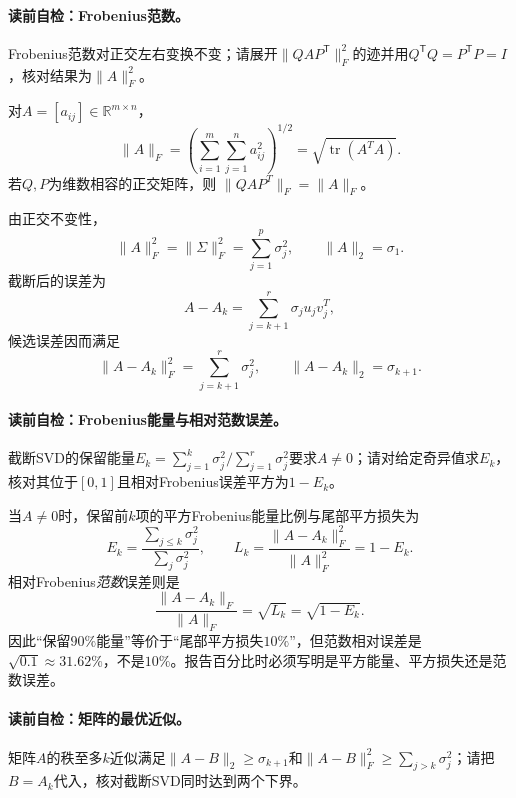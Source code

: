 \paragraph{读前自检：Frobenius范数。}Frobenius范数对正交左右变换不变；请展开$\lVert QAP^{\mathsf T}\rVert_F^2$的迹并用$Q^{\mathsf T}Q=P^{\mathsf T}P=I$，核对结果为$\lVert A\rVert_F^2$。\par

\begin{definition}[Frobenius范数]\label{def:V4-C03-frobenius}
对$A=[a_{ij}]\in\mathbb R^{m\times n}$，
\[
\|A\|_F=\left(\sum_{i=1}^{m}\sum_{j=1}^{n}a_{ij}^2\right)^{1/2}
=\sqrt{\operatorname{tr}(A^TA)}.
\]
若$Q,P$为维数相容的正交矩阵，则
$\|QAP^T\|_F=\|A\|_F$。
\end{definition}

由正交不变性，
\[
\|A\|_F^2=\|\Sigma\|_F^2=\sum_{j=1}^{p}\sigma_j^2,
\qquad
\|A\|_2=\sigma_1.
\]
截断后的误差为
\[
A-A_k=\sum_{j=k+1}^{r}\sigma_ju_jv_j^T,
\]
候选误差因而满足
\[
\|A-A_k\|_F^2=\sum_{j=k+1}^{r}\sigma_j^2,\qquad
\|A-A_k\|_2=\sigma_{k+1}.
\]

\paragraph{读前自检：Frobenius能量与相对范数误差。}截断SVD的保留能量$E_k=\sum_{j=1}^k\sigma_j^2/\sum_{j=1}^r\sigma_j^2$要求$A\ne0$；请对给定奇异值求$E_k$，核对其位于$[0,1]$且相对Frobenius误差平方为$1-E_k$。\par

\begin{definition}[Frobenius能量与相对范数误差]\label{def:V4-C03-energy-error}
当$A\ne0$时，保留前$k$项的平方Frobenius能量比例与尾部平方损失为
\[
E_k=\frac{\sum_{j\le k}\sigma_j^2}{\sum_j\sigma_j^2},
\qquad
L_k=\frac{\|A-A_k\|_F^2}{\|A\|_F^2}=1-E_k.
\]
相对Frobenius\emph{范数}误差则是
\[
\frac{\|A-A_k\|_F}{\|A\|_F}=\sqrt{L_k}=\sqrt{1-E_k}.
\]
因此“保留$90\%$能量”等价于“尾部平方损失$10\%$”，但范数相对误差是$\sqrt{0.1}\approx31.62\%$，不是$10\%$。报告百分比时必须写明是平方能量、平方损失还是范数误差。
\end{definition}

\paragraph{读前自检：矩阵的最优近似。}矩阵$A$的秩至多$k$近似满足$\lVert A-B\rVert_2\ge\sigma_{k+1}$和$\lVert A-B\rVert_F^2\ge\sum_{j>k}\sigma_j^2$；请把$B=A_k$代入，核对截断SVD同时达到两个下界。\par
